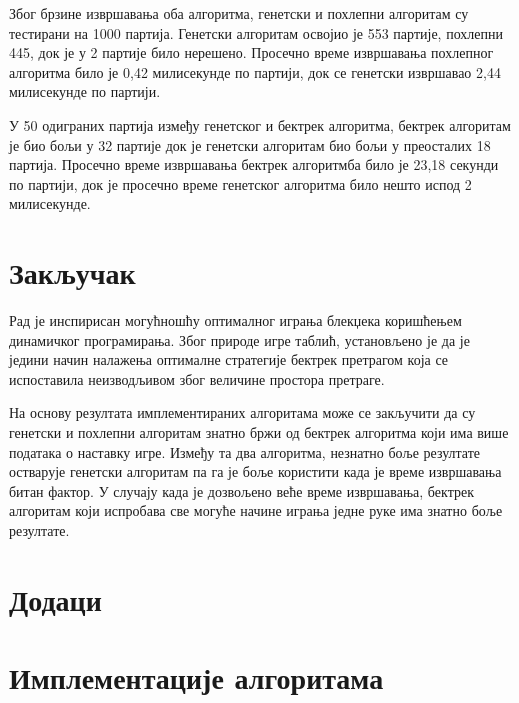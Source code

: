 \documentclass[a4paper, 12pt, ngerman]{article}
\let\oldsection\section
\renewcommand\section{\clearpage\oldsection}
\begin{document}
Због брзине извршавања оба алгоритма, генетски и похлепни алгоритам су тестирани на 1000 партија. Генетски алгоритам освојио је 553 партије, похлепни 445, док је у 2 партије било нерешено. Просечно време извршавања похлепног алгоритма било је 0,42 милисекунде по партији, док се генетски извршавао 2,44 милисекунде по партији. 

У 50 одиграних партија између генетског и бектрек алгоритма, бектрек алгоритам је био бољи у 32 партије док је генетски алгоритам био бољи у преосталих 18 партија. Просечно време извршавања бектрек алгоритмба било је 23,18 секунди по партији, док је просечно време генетског алгоритма било нешто испод 2 милисекунде.


\section{Закључак}
Рад је инспирисан могућношћу оптималног играња блекџека коришћењем динамичког програмирања. Због природе игре таблић, установљено је да је једини начин налажења оптималне стратегије бектрек претрагом која се испоставила неизводљивом због величине простора претраге.

На основу резултата имплементираних алгоритама може се закључити да су генетски и похлепни алгоритам знатно бржи од бектрек алгоритма који има више података о наставку игре. Између та два алгоритма, незнатно боље резултате остварује генетски алгоритам па га је боље користити када је време извршавања битан фактор. У случају када је дозвољено веће време извршавања, бектрек алгоритам који испробава све могуће начине играња једне руке има знатно боље резултате.



\appendix
{}
\section*{Додаци}
\section{Имплементације алгоритама}


\pagebreak


\pagebreak


\pagebreak
\end{document}
